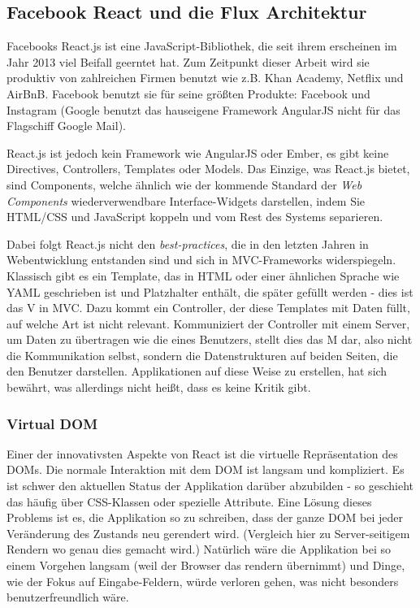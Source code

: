 \documentclass[12pt,twoside]{book}
\begin{document}
\subsection{Facebook React und die Flux Architektur}\label{sec:flux}

Facebooks React.js ist eine JavaScript-Bibliothek, die seit ihrem erscheinen im Jahr 2013 viel Beifall geerntet hat. Zum Zeitpunkt dieser Arbeit wird sie produktiv von zahlreichen Firmen benutzt wie z.B. Khan Academy\cite{khan}, Netflix\cite{netflix} und AirBnB\cite{airbnb}. Facebook benutzt sie für seine größten Produkte: Facebook und Instagram (Google benutzt das hauseigene Framework AngularJS nicht für das Flagschiff Google Mail).

React.js ist jedoch kein Framework wie AngularJS oder Ember, es gibt keine Directives, Controllers, Templates oder Models. Das Einzige, was React.js bietet, sind Components, welche ähnlich wie der kommende Standard der \textit{Web Components} \cite{webcomponents} wiederverwendbare Interface-Widgets darstellen, indem Sie HTML/CSS und JavaScript koppeln und vom Rest des Systems separieren.

Dabei folgt React.js nicht den \textit{best-practices}, die in den letzten Jahren in Webentwicklung entstanden sind und sich in MVC-Frameworks widerspiegeln. Klassisch gibt es ein Template, das in HTML oder einer ähnlichen Sprache wie YAML geschrieben ist und Platzhalter enthält, die später gefüllt werden - dies ist das V in MVC.
Dazu kommt ein Controller, der diese Templates mit Daten füllt, auf welche Art ist nicht relevant. Kommuniziert der Controller mit einem Server, um Daten zu übertragen wie die eines Benutzers, stellt dies das M dar, also nicht die Kommunikation selbst, sondern die Datenstrukturen auf beiden Seiten, die den Benutzer darstellen.
Applikationen auf diese Weise zu erstellen, hat sich bewährt, was allerdings nicht heißt, dass es keine Kritik gibt.

\subsubsection*{Virtual DOM}

Einer der innovativsten Aspekte von React ist die virtuelle Repräsentation des DOMs\cite{DOM}. Die normale Interaktion mit dem DOM ist langsam und kompliziert. Es ist schwer den aktuellen Status der Applikation darüber abzubilden - so geschieht das häufig über CSS-Klassen oder spezielle Attribute.
Eine Lösung dieses Problems ist es, die Applikation so zu schreiben, dass der ganze DOM bei jeder Veränderung des Zustands neu gerendert wird. (Vergleich hier zu Server-seitigem Rendern wo genau dies gemacht wird.) Natürlich wäre die Applikation bei so einem Vorgehen langsam (weil der Browser das rendern übernimmt) und Dinge, wie der Fokus auf Eingabe-Feldern, würde verloren gehen, was nicht besonders benutzerfreundlich wäre.
\end{document}
